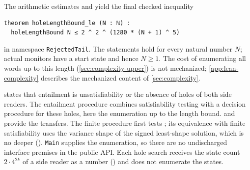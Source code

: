 The arithmetic estimates  and
 yield the final checked inequality
\begin{lstlisting}
theorem holeLengthBound_le (N : ℕ) :
  holeLengthBound N ≤ 2 ^ 2 ^ (1280 * (N + 1) ^ 5)
\end{lstlisting}
in namespace \texttt{RejectedTail}. The statements hold for every natural
number $N$; actual monitors have a start state and hence $N\ge1$.
The cost of enumerating all words up to this length
(\cref{sec:complexity-upper}) is not mechanized;
\cref{app:lean-complexity} describes the mechanized content of
\cref{sec:complexity}.

 states that entailment is
unsatisfiability or the absence of holes of both side readers. The
entailment procedure  combines
satisfiability testing with a decision procedure for these holes, here the
enumeration  up to the length bound.
 and 
provide the transfers. The finite procedure first tests ;
its equivalence with finite satisfiability uses the variance shape of the
signed least-shape solution, which is no deeper
(). \texttt{Main} supplies the enumeration,
so there are no undischarged interface premises in the public API. Each
hole search receives the state count $2\cdot4^{2k}$ of a side reader as a
number () and does not enumerate the states.

